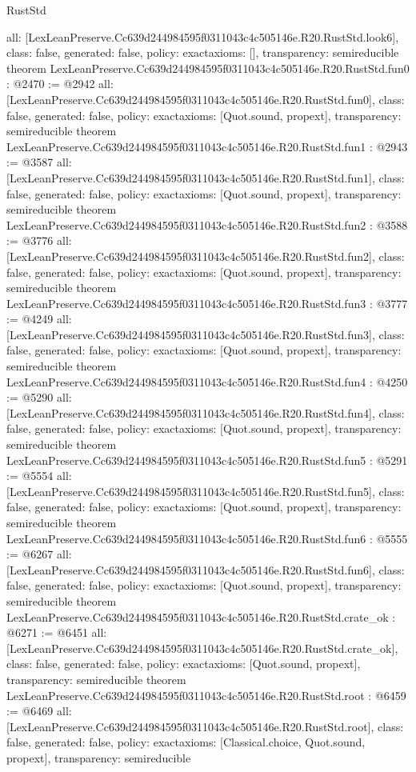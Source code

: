 \begin{lexlean}{RustStd}
\begin{coremodule}
{  all: [LexLeanPreserve.Cc639d244984595f0311043c4c505146e.R20.RustStd.look6],
  class: false,
  generated: false,
  policy: exact{axioms: []},
  transparency: semireducible
}
theorem LexLeanPreserve.Cc639d244984595f0311043c4c505146e.R20.RustStd.fun0 : @2470 := @2942 {
  all: [LexLeanPreserve.Cc639d244984595f0311043c4c505146e.R20.RustStd.fun0],
  class: false,
  generated: false,
  policy: exact{axioms: [Quot.sound, propext]},
  transparency: semireducible
}
theorem LexLeanPreserve.Cc639d244984595f0311043c4c505146e.R20.RustStd.fun1 : @2943 := @3587 {
  all: [LexLeanPreserve.Cc639d244984595f0311043c4c505146e.R20.RustStd.fun1],
  class: false,
  generated: false,
  policy: exact{axioms: [Quot.sound, propext]},
  transparency: semireducible
}
theorem LexLeanPreserve.Cc639d244984595f0311043c4c505146e.R20.RustStd.fun2 : @3588 := @3776 {
  all: [LexLeanPreserve.Cc639d244984595f0311043c4c505146e.R20.RustStd.fun2],
  class: false,
  generated: false,
  policy: exact{axioms: [Quot.sound, propext]},
  transparency: semireducible
}
theorem LexLeanPreserve.Cc639d244984595f0311043c4c505146e.R20.RustStd.fun3 : @3777 := @4249 {
  all: [LexLeanPreserve.Cc639d244984595f0311043c4c505146e.R20.RustStd.fun3],
  class: false,
  generated: false,
  policy: exact{axioms: [Quot.sound, propext]},
  transparency: semireducible
}
theorem LexLeanPreserve.Cc639d244984595f0311043c4c505146e.R20.RustStd.fun4 : @4250 := @5290 {
  all: [LexLeanPreserve.Cc639d244984595f0311043c4c505146e.R20.RustStd.fun4],
  class: false,
  generated: false,
  policy: exact{axioms: [Quot.sound, propext]},
  transparency: semireducible
}
theorem LexLeanPreserve.Cc639d244984595f0311043c4c505146e.R20.RustStd.fun5 : @5291 := @5554 {
  all: [LexLeanPreserve.Cc639d244984595f0311043c4c505146e.R20.RustStd.fun5],
  class: false,
  generated: false,
  policy: exact{axioms: [Quot.sound, propext]},
  transparency: semireducible
}
theorem LexLeanPreserve.Cc639d244984595f0311043c4c505146e.R20.RustStd.fun6 : @5555 := @6267 {
  all: [LexLeanPreserve.Cc639d244984595f0311043c4c505146e.R20.RustStd.fun6],
  class: false,
  generated: false,
  policy: exact{axioms: [Quot.sound, propext]},
  transparency: semireducible
}
theorem LexLeanPreserve.Cc639d244984595f0311043c4c505146e.R20.RustStd.crate_ok : @6271 := @6451 {
  all: [LexLeanPreserve.Cc639d244984595f0311043c4c505146e.R20.RustStd.crate_ok],
  class: false,
  generated: false,
  policy: exact{axioms: [Quot.sound, propext]},
  transparency: semireducible
}
theorem LexLeanPreserve.Cc639d244984595f0311043c4c505146e.R20.RustStd.root : @6459 := @6469 {
  all: [LexLeanPreserve.Cc639d244984595f0311043c4c505146e.R20.RustStd.root],
  class: false,
  generated: false,
  policy: exact{axioms: [Classical.choice, Quot.sound, propext]},
  transparency: semireducible
}


\end{coremodule}
\end{lexlean}

